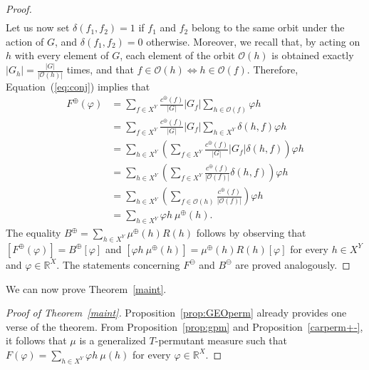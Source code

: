 \documentclass[11pt]{article}
\newcommand{\R}{\mathbb{R}}
\newcommand{\p}{\varphi}
\newtheorem{definition}[theorem]{Definition}
\begin{document}
\begin{proof}
\begin{align}
    \end{align}
    Let us now set $\delta(f_1, f_2) = 1$ if $f_1$ and $f_2$ belong to the same orbit under the action of $G$, and $\delta(f_1, f_2) = 0$ otherwise. Moreover, we recall that, by acting on $h$ with every element of $G$, each element of the orbit $\mathcal{O}(h)$ is obtained exactly $|G_h| = \frac{|G|}{|\mathcal{O}(h)|}$ times, and that $f \in \mathcal{O}(h) \iff h \in \mathcal{O}(f)$. Therefore, Equation~(\ref{eq:conj}) implies that
    \begin{align*}
        F^\oplus(\varphi) & = \sum_{f \in X^Y} \frac{c^\oplus(f)}{\left|G\right|} \left|G_f\right| \sum_{h \in \mathcal{O}(f)} \varphi h \\
        & = \sum_{f \in X^Y} \frac{c^\oplus(f)}{\left|G\right|} \left|G_f\right| \sum_{h \in X^Y} \delta(h, f)\varphi h \\
        & = \sum_{h \in X^Y} \left( \sum_{f \in X^Y} \frac{c^\oplus(f)}{\left|G\right|} \left|G_f\right| \delta(h, f) \right) \varphi h \\
        & = \sum_{h \in X^Y} \left( \sum_{f \in X^Y} \frac{c^\oplus(f)}{\left|\mathcal{O}(f)\right|} \delta(h, f) \right) \varphi h \\
        & = \sum_{h \in X^Y} \left( \sum_{f \in \mathcal{O}(h)} \frac{c^\oplus(f)}{\left|\mathcal{O}(f)\right|} \right) \varphi h \\
        & = \sum_{h \in X^Y} \varphi h \ \mu^\oplus(h).
    \end{align*}
    The equality $B^\oplus = \sum_{h \in X^Y} \mu^\oplus(h) R(h)$ follows by observing that 
    $[F^\oplus(\p)]=B^\oplus [\p]$ and
    $\left[\varphi h \ \mu^\oplus(h)\right]=\mu^\oplus(h) R(h)[\p]$ for every $h\in X^Y$ and $\p\in \R^X$. The statements concerning $F^\ominus$ and $B^\ominus$ are proved analogously.
\end{proof}

We can now prove Theorem~\ref{maint}.
\begin{proof}[Proof of Theorem~\ref{maint}]
   Proposition~\ref{prop:GEOperm} already provides one verse of the theorem. From Proposition~\ref{prop:gpm} and Proposition~\ref{carperm+-}, it follows that $\mu$ is a generalized $T$-permutant measure such that $F(\varphi) = \sum_{h \in X^Y} \varphi h \ \mu(h)$ for every $\varphi \in \mathbb{R}^X$.
\end{proof}


\end{document}
